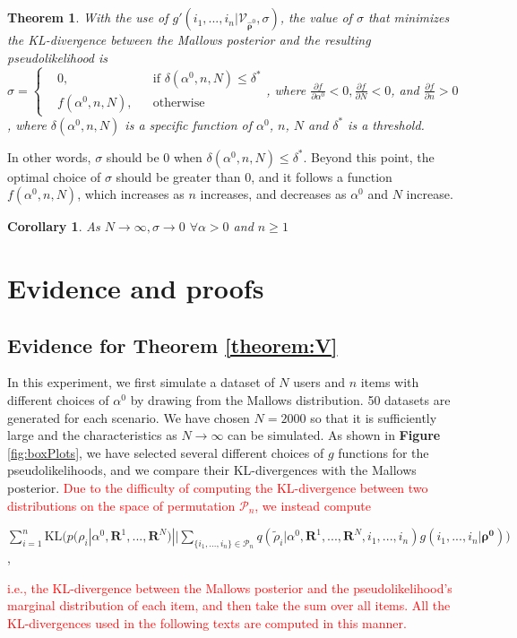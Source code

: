 \documentclass[11pt, oneside]{article}   	%
\newtheorem{theorem}{Theorem}[subsection]
\newtheorem{corollary}{Corollary}[theorem]
\begin{document}
\subsection{ }
\begin{theorem}\label{theorem:sigmafunction}
With the use of  $g'(i_1, ...,i_n|\mathcal{V}_{\hat{\bm{\rho}}^0}, \sigma)$, the value of $\sigma$ that minimizes the KL-divergence between the Mallows posterior and the resulting pseudolikelihood is\\
 $
\sigma = \left \{
\begin{aligned}
&0, && \text{if } \delta(\alpha^0,n,N)\leq \delta ^{*} \\
&f(\alpha^0, n,N), && \text{otherwise}
\end{aligned} \right.
$, where $\frac{\partial f}{\partial \alpha^0} <0, \frac{\partial f}{\partial N} <0$, and $\frac{\partial f}{\partial n} >0$, where $\delta(\alpha^0, n,N)$ is a specific function of $\alpha^0$, $n$, $N$ and $\delta ^*$ is a threshold.
\end{theorem}

In other words, $\sigma$ should be 0 when $\delta(\alpha^0,n,N) \leq \delta^*$. Beyond this point, the optimal choice of $\sigma$ should be greater than 0, and it follows a function $f(\alpha^0,n,N)$, which increases as $n$ increases, and decreases as $\alpha^0$ and $N$ increase.
\begin{corollary}
	As $N \rightarrow \infty,\sigma \rightarrow 0$  $ \forall \alpha >0$ and $n \geq 1$
\end{corollary}

\section{Evidence and proofs}
\subsection{Evidence for Theorem \ref{theorem:V}}
In this experiment, we first simulate a dataset of $N$ users and $n$ items with different choices of $\alpha^0$ by drawing from the Mallows distribution.  50 datasets are generated for each scenario. We have chosen $N = 2000$ so that it is sufficiently large and the characteristics as $N \rightarrow \infty$ can be simulated. As shown in \textbf{Figure} \ref{fig:boxPlots}, we have selected several different choices of $g$ functions for the pseudolikelihoods, and we compare their KL-divergences with the Mallows posterior. \textcolor{red}{Due to the difficulty of computing the KL-divergence between two distributions on the space of permutation $\mathcal{P}_n$, we instead compute }
\begin{center}

 $\sum\limits_{i=1}^{n}\text{KL}\big( p(\rho_i|\alpha^0, \bm{R}^1,..., \bm{R}^N) || \sum\limits_{\{i_1, ..., i_n\}\in \mathcal{P}_n}q(\tilde{{\rho}}_i|\alpha^0, \bm{R}^1, ..., \bm{R}^N, i_1, ..., i_n)g(i_1, ..., i_n|\bm{\rho^0})\big)$, \end{center}\textcolor{red}{i.e., the KL-divergence between the Mallows posterior and the pseudolikelihood's marginal distribution of each item, and then take the sum over all items. All the KL-divergences used in the following texts are computed in this manner.} 
\end{document}
